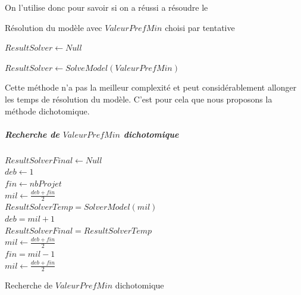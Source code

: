 \documentclass[final,poster]{polytech/polytech}
\begin{document}
On l'utilise donc pour savoir si on a réussi a résoudre le
\begin{algorithm}
\caption{\label{chap:problem_affectation:algo:recherche_tatonnement}Résolution du modèle avec $ValeurPrefMin$ choisi par tentative}

$ResultSolver \gets Null$ \\

{

	$ResultSolver \gets SolveModel(ValeurPrefMin)$ \\



	{
		\Break

	}
}
\end{algorithm}

Cette méthode n'a pas la meilleur complexité et peut considérablement allonger les temps de résolution du modèle. C'est pour cela que nous proposons la méthode dichotomique.

\subparagraph{Recherche de $ValeurPrefMin$ dichotomique}
\begin{algorithm}
$ResultSolverFinal \gets Null$ \\
$deb \gets 1$ \\
$fin \gets nbProjet$ \\
$mil \gets \frac{deb+fin}{2}$ \\
{
	$ResultSolverTemp=SolverModel(mil)$\\
{
$deb=mil+1$\\
$ResultSolverFinal=ResultSolverTemp$\\
$mil \gets \frac{deb+fin}{2}$ \\
}
\Else
{
	$fin=mil-1$\\
	$mil \gets \frac{deb+fin}{2}$ \\
}
}

\caption{\label{chap:problem_affectation:algo:recherche_dichotomique}Recherche de $ValeurPrefMin$ dichotomique}
\end{algorithm}
\end{document}
